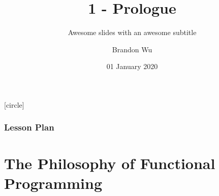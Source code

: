 \documentclass[aspectratio=169]{beamer}
\title{1 - Prologue} %
\subtitle{Awesome slides with an awesome subtitle} %
\date{01 January 2020} %
\author{Brandon Wu} %
\newif\ifcolorlambda
\begin{document}
\ifweb
    \renewcommand{\pause}{}
\fi

[circle]

\begin{comment}
{
\begin{frame}[plain]
    \colorlambdatrue
    \titlepage
\end{frame}
}
\end{comment}

\begin{comment}
  Future Retro from ANIMUSIC plays as students walk in
  When the music ends, BRANDON bursts in through the door

  HELLO EVERYONE! Welcome to 15-150, Principles of Functional Programming.

  I'm super excited to have all of you here. My name is Brandon Wu, and I'll be your
  primary instructor for this summer. Please call me Brandon, though confusingly
  there is also a TA named Brandon, so I guess we'll have to just figure that one out.

  To properly introduce myself, I'm actually a recent graduate of CMU, I graduated
  with my bachelor's degree in computer science last spring, and when I was in undergrad,
  I TA'd this class five times, and I was Head TA for two semesters. While I am lucky
  enough to teach this course to you this summer, I have a full-time job working  
  for a company called Semgrep in the Bay, where I actually do functional programming
  every single day.

  With intros over, let's hop to it. Today we're here to learn functional programming.
\end{comment}

\begin{frame}[fragile]
  \frametitle{Lesson Plan}

  \tableofcontents
\end{frame}

\section{The Philosophy of Functional Programming}

\begin{frame}[plain]
  \begin{center}
    \huge {}
  \end{center}
\end{frame}
\end{document}
